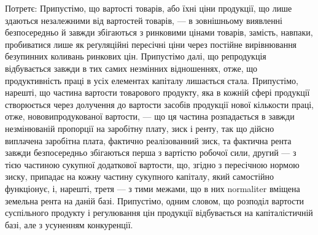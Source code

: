 Потретє: Припустімо, що вартості товарів, або їхні ціни продукції, що
лише здаються незалежними від вартостей товарів, — в зовнішньому виявленні
безпосередньо й завжди збігаються з ринковими цінами товарів, замість, навпаки,
пробиватися лише як реґуляційні пересічні ціни через постійне вирівнювання
безупинних коливань ринкових цін. Припустімо далі, що репродукція відбувається
завжди в тих самих незмінних відношеннях, отже, що продуктивність праці в усіх
елементах капіталу лишається стала. Припустімо, нарешті, що частина вартости
товарового продукту, яка в кожній сфері продукції створюється через долучення
до вартости засобів продукції нової кількости праці, отже, нововипродукованої
вартости, — що ця частина розпадається в завжди незмінюваній пропорції на заробітну
плату, зиск і ренту, так що дійсно виплачена заробітна плата, фактично
реалізованний зиск, та фактична рента завжди безпосередньо збігаються перша
з вартістю робочої сили, другий — з тією частиною сукупної додаткової вартости,
що, згідно з пересічною нормою зиску, припадає на кожну частину сукупного
капіталу, який самостійно функціонує, і, нарешті, третя — з тими межами, що в
них normaliter вміщена земельна рента на даній базі. Припустімо, одним словом,
що розподіл вартости суспільного продукту і регулювання цін продукції відбувається
на капіталістичній базі, але з усуненням конкуренції.
